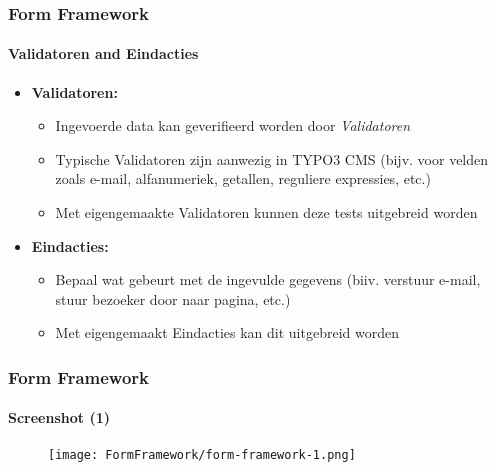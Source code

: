 \begin{frame}[fragile]
	\frametitle{Form Framework}
	\framesubtitle{Validatoren and Eindacties}

	\begin{itemize}

		\item \textbf{Validatoren:}

			\begin{itemize}
				\item Ingevoerde data kan geverifieerd worden door \textit{Validatoren}
				\item Typische Validatoren zijn aanwezig in TYPO3 CMS
					(bijv. voor velden zoals e-mail, alfanumeriek, getallen, reguliere expressies, etc.)
				\item Met eigengemaakte Validatoren kunnen deze tests uitgebreid worden
			\end{itemize}

		\item \textbf{Eindacties:}

			\begin{itemize}
				\item Bepaal wat gebeurt met de ingevulde gegevens
					(biiv. verstuur e-mail, stuur bezoeker door naar pagina, etc.)
				\item Met eigengemaakt Eindacties kan dit uitgebreid worden
			\end{itemize}

	\end{itemize}

\end{frame}

\begin{frame}[fragile]
	\frametitle{Form Framework}
	\framesubtitle{Screenshot (1)}

	\begin{figure}
		\texttt{[image: FormFramework/form-framework-1.png]}
	\end{figure}

\end{frame}

